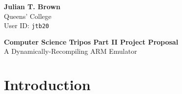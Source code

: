 %
%

\thispagestyle{empty}

\begin{flushright}
{\Large {\bf Julian T. Brown}\vspace{3mm} \\
Queens' College\vspace{1mm} \\
User ID: {\tt jtb20}} \\
\end{flushright}

\vspace{2cm}

\begin{center}
{\LARGE {\bf Computer Science Tripos Part II Project Proposal} \vspace{5mm} \\
     A Dynamically-Recompiling ARM Emulator}
\end{center}


\newpage

%
%


\section*{Introduction}

